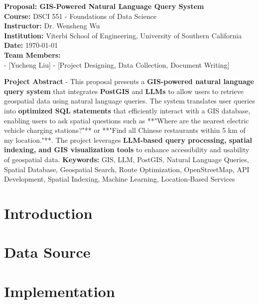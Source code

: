 \documentclass{article}
\begin{document}
\begin{titlepage}
    \centering
    \vspace*{2cm}
    {\Huge \textbf{Proposal: GIS-Powered Natural Language Query System}} \\
    \vspace{1.5cm}
    \textbf{Course:} DSCI 551 - Foundations of Data Science \\
    \textbf{Instructor:} Dr. Wensheng Wu \\
    \textbf{Institution:} Viterbi School of Engineering, University of Southern California \\
    \textbf{Date:} \today \\
    \vfill
    \textbf{Team Members:} \\
    - [Yucheng Liu] - [Project Designing, Data Collection, Document Writing] \\
    \vfill
    \begin{justify}
        \textbf{Project Abstract} - This proposal presents a \textbf{GIS-powered natural language query system} that integrates \textbf{PostGIS} and \textbf{LLMs} to allow users to retrieve geospatial data using natural language queries. The system translates user queries into \textbf{optimized SQL statements} that efficiently interact with a GIS database, enabling users to ask spatial questions such as **"Where are the nearest electric vehicle charging stations?"** or **"Find all Chinese restaurants within 5 km of my location."**. The project leverages \textbf{LLM-based query processing, spatial indexing, and GIS visualization tools} to enhance accessibility and usability of geospatial data.
        \vfill
        \textbf{Keywords:} GIS, LLM, PostGIS, Natural Language Queries, Spatial Database, Geospatial Search, Route Optimization, OpenStreetMap, API Development, Spatial Indexing, Machine Learning, Location-Based Services
    \end{justify}

\end{titlepage}

\section{Introduction}

\section{Data Source}

\section{Implementation}
\end{document}
